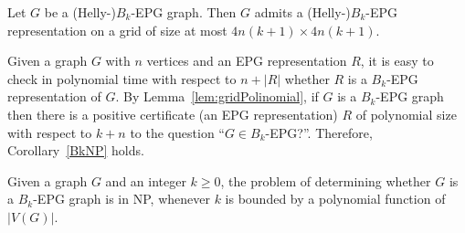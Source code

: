 \begin{lemma}\label{lem:gridPolinomial}
Let $G$ be a (Helly-)$B_k$-EPG graph. Then $G$ admits a (Helly-)$B_k$-EPG representation on a grid of size at most $4n(k+1) \times 4n(k+1)$.
\end{lemma}

Given a graph $G$ with $n$ vertices and an EPG representation $R$, it is easy to check in polynomial time with respect to $n +|R|$ whether $R$ is a $B_k$-EPG representation of $G$. By Lemma~\ref{lem:gridPolinomial}, if $G$ is a $B_k$-EPG graph then there is a positive certificate (an EPG representation) $R$ of polynomial size  with respect to $k+n$ to the question ``$G\in B_k$-EPG?''. Therefore, Corollary~\ref{BkNP} holds.

\begin{corollary}\label{BkNP}
Given a graph $G$ and an integer $k\geq 0$, the problem of determining whether $G$ is a $B_k$-EPG graph is in NP, whenever $k$ is bounded by a polynomial function of $|V(G)|$.
\end{corollary}

